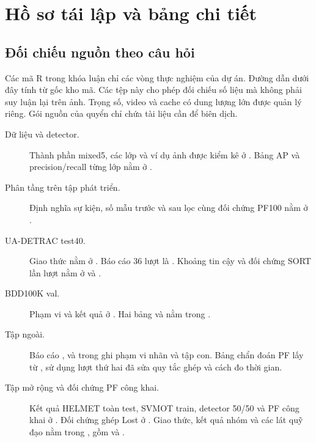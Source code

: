 \chapter{Hồ sơ tái lập và bảng chi tiết}\label{app:ho-so}
\section{Đối chiếu nguồn theo câu hỏi}
Các mã R trong khóa luận chỉ các vòng thực nghiệm của dự án. Đường dẫn dưới đây tính từ gốc kho mã. Các tệp này cho phép đối chiếu số liệu mà không phải suy luận lại trên ảnh. Trọng số, video và cache có dung lượng lớn được quản lý riêng. Gói nguồn của quyển chỉ chứa tài liệu cần để biên dịch.

\begin{description}
\item[Dữ liệu và detector.] Thành phần mixed5, các lớp và ví dụ ảnh được kiểm kê ở . Bảng AP và precision/recall từng lớp nằm ở .
\item[Phân tầng trên tập phát triển.] Định nghĩa sự kiện, số mẫu trước và sau lọc cùng đối chứng PF100 nằm ở .
\item[UA-DETRAC test40.] Giao thức nằm ở . Báo cáo 36 lượt là . Khoảng tin cậy và đối chứng SORT lần lượt nằm ở  và .
\item[BDD100K val.] Phạm vi và kết quả ở . Hai bảng  và  nằm trong .
\item[Tập ngoài.] Báo cáo ,  và  trong  ghi phạm vi nhãn và tập con. Bảng chẩn đoán PF lấy từ , sử dụng lượt thứ hai đã sửa quy tắc ghép và cách đo thời gian.
\item[Tập mở rộng và đối chứng PF công khai.] Kết quả HELMET toàn test, SVMOT train, detector 50/50 và PF công khai ở . Đối chứng ghép Lost ở . Giao thức, kết quả nhóm và các lát quỹ đạo nằm trong , gồm  và .

\end{description}
